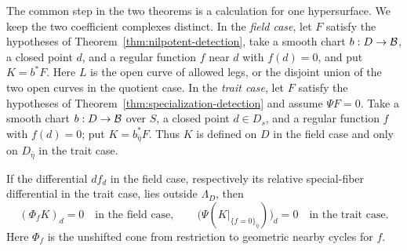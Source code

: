 The common step in the two theorems is a calculation for one hypersurface.
We keep the two coefficient complexes distinct.  In the \emph{field case},
let $F$ satisfy the hypotheses of Theorem~\ref{thm:nilpotent-detection},
take a smooth chart $b:D\to\mathcal B$, a closed point $d$, and a regular function
$f$ near $d$ with $f(d)=0$, and put $K=b^*F$.
Here $L$ is the open curve of allowed legs, or the disjoint union of the
two open curves in the quotient case.  In the \emph{trait case}, let $F$
satisfy the hypotheses of Theorem~\ref{thm:specialization-detection}
and assume $\Psi F=0$.  Take a smooth chart $b:D\to\mathcal B$ over $S$,
a closed point $d\in D_s$, and a regular function $f$ with $f(d)=0$;
put $K=b_{\bar\eta}^*F$.  Thus $K$ is defined on $D$ in the field case
and only on $D_{\bar\eta}$ in the trait case.

\begin{lemma}\label{lem:detection-hypersurface}
If the differential $df_d$ in the field case, respectively its relative
special-fiber differential in the trait case, lies outside $\Lambda_D$,
then
\[
      (\Phi_f K)_d=0
      \quad\text{in the field case},\qquad
      \bigl(\Psi(K|_{\{f=0\}_{\bar\eta}})\bigr)_d=0
      \quad\text{in the trait case}.
\]
Here $\Phi_f$ is the unshifted cone from restriction to geometric nearby
cycles for $f$.
\end{lemma}

